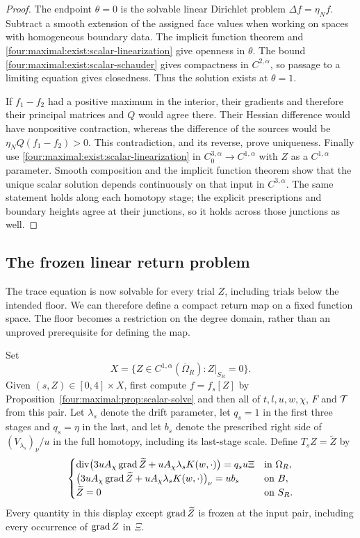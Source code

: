 \begin{proof}
The endpoint $\theta=0$ is the solvable linear Dirichlet problem
$\Delta f=\eta_N f$.  Subtract a smooth extension of the assigned face
values when working on spaces with homogeneous boundary data.
The implicit function theorem and \eqref{four:maximal:exist:scalar-linearization}
give openness in $\theta$.  The bound
\eqref{four:maximal:exist:scalar-schauder} gives compactness in $C^{2,\alpha}$,
so passage to a limiting equation gives closedness.  Thus the solution
exists at $\theta=1$.

If $f_1-f_2$ had a positive maximum in the interior, their gradients
and therefore their principal matrices and $Q$ would agree there.
Their Hessian difference would have nonpositive contraction, whereas
the difference of the sources would be
$\eta_N Q(f_1-f_2)>0$.  This contradiction, and its reverse, prove
uniqueness.  Finally use \eqref{four:maximal:exist:scalar-linearization} in
$C^{3,\alpha}_0\to C^{1,\alpha}$ with $Z$ as a
$C^{1,\alpha}$ parameter.  Smooth composition and the implicit
function theorem show that the unique scalar solution depends
continuously on that input in $C^{3,\alpha}$.  The same statement
holds along each homotopy stage; the explicit prescriptions and
boundary heights agree at their junctions, so it holds across those
junctions as well.
\end{proof}

\subsection{The frozen linear return problem}

The trace equation is now solvable for every trial $Z$, including trials
below the intended floor.  We can therefore define a compact return map
on a fixed function space.  The floor becomes a restriction on the
degree domain, rather than an unproved prerequisite for defining the map.

Set
\[
 X=\{Z\in C^{1,\alpha}(\overline\Omega_R):Z|_{S_R}=0\}.
\]
Given $(s,Z)\in[0,4]\times X$, first compute $f=f_s[Z]$ by
Proposition~\ref{four:maximal:prop:scalar-solve} and then all of $t,l,u,w,\chi$,
$F$ and $\mathcal T$ from this pair.  Let $\lambda_s$ denote the drift
parameter, let $q_s=1$ in the first three stages and $q_s=\eta$ in
the last, and let $b_s$ denote the prescribed right side of
$(V_{\lambda_s})_\nu/u$ in the full homotopy, including its last-stage
scale.  Define $T_sZ=\widetilde Z$ by
\begin{equation}\label{four:maximal:exist:return-problem}
 \begin{cases}
 \operatorname{div}\bigl(3uA_\chi\operatorname{grad}\widetilde Z
                  +uA_\chi\lambda_sK(w,\cdot)\bigr)=q_su\Xi
                         &\text{in }\Omega_R,\\
 \bigl(3uA_\chi\operatorname{grad}\widetilde Z
                  +uA_\chi\lambda_sK(w,\cdot)\bigr)_\nu=ub_s
                         &\text{on }B,\\
 \widetilde Z=0          &\text{on }S_R.
 \end{cases}
\end{equation}
Every quantity in this display except $\operatorname{grad}\widetilde Z$ is frozen
at the input pair, including every occurrence of $\operatorname{grad} Z$ in $\Xi$.

